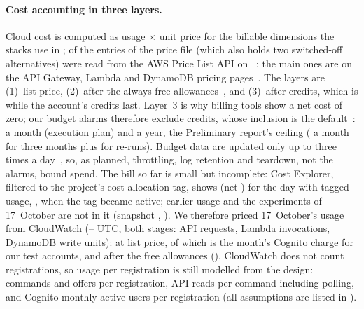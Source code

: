 \paragraph{Cost accounting in three layers.}
Cloud cost is computed as usage $\times$ unit price for the \CostDimensionsUsed{} billable dimensions
the stacks use in ; \CostPricesVerified{} of the \CostPricesTotal{} entries of
the price file (which also holds two switched-off alternatives) were read from the AWS Price List API
on \CostPricingDate~\cite{aws-pricelist-bulk-api}; the main ones are on the API Gateway, Lambda and
DynamoDB pricing pages~\cite{aws-pricing-apigw,aws-pricing-lambda,aws-pricing-dynamodb}. The layers are (1)~list
price, (2)~after the always-free allowances~\cite{aws-free-tier}, and (3)~after credits, which is
 while the account's credits last. Layer~3 is why billing tools show a net cost of zero; our
budget alarms therefore exclude credits, whose inclusion is the default~\cite{aws-budgets-costtypes}:
 a month (execution plan) and  a year, the Preliminary report's ceiling ( a month
for three months plus  for re-runs). Budget data are updated only up to three times a
day~\cite{aws-budgets}, so, as planned, throttling, log retention and teardown, not the alarms, bound
spend. The bill so far is small but incomplete: Cost Explorer, filtered to the project's cost
allocation tag, shows \usd\CostBillListUsd{} (net \usd\CostBillNetUsd) for the \CostBillTaggedDays{}
day with tagged usage, \CostBillFirstDay, when the tag became active; earlier usage and the
experiments of 17~October are not in it (snapshot \CostBillSnapshotDate, ).
We therefore priced 17~October's usage from CloudWatch (\CostMeasuredWindowStart--\CostMeasuredWindowEnd{}
UTC, both stages: \CostMeasuredApiRequests{} API requests, \CostMeasuredLambdaInvocations{} Lambda
invocations, \CostMeasuredWriteUnits{} DynamoDB write units): \usd\CostMeasuredListUsd{} at list
price, of which \usd\CostMeasuredCognitoListUsd{} is the month's Cognito charge for our test
accounts, and \usd\CostMeasuredAfterFreeUsd{} after the free allowances
(). CloudWatch does not count registrations, so usage per
registration is still modelled from the design: \CostAssumeCommandsPerRegistration{} commands and \CostAssumeOffersPerRegistration{} offers
per registration, \CostAssumeReadsPerCommand{} API reads per command including polling, and
\CostAssumeMauPerRegistration{} Cognito monthly active users per registration (all assumptions are
listed in ).

